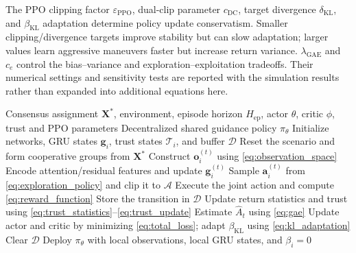The PPO clipping factor $\varepsilon_{\mathrm{PPO}}$, dual-clip parameter $c_{\mathrm{DC}}$,
target divergence $\delta_{\mathrm{KL}}$, and $\beta_{\mathrm{KL}}$ adaptation determine policy
update conservatism. Smaller clipping/divergence targets improve stability but can slow
adaptation; larger values learn aggressive maneuvers faster but increase return variance.
$\lambda_{\mathrm{GAE}}$ and $c_e$ control the bias--variance and exploration--exploitation
tradeoffs. Their numerical settings and sensitivity tests are reported with the simulation
results rather than expanded into additional equations here.

\begin{algorithm}[!t]
\caption{ART-MAPPO Cooperative Interception Guidance}
\label{alg:artmappo}
\footnotesize
\begin{algorithmic}[1]
\REQUIRE Consensus assignment $\mathbf X^{*}$, environment, episode horizon
$H_{\mathrm{ep}}$, actor $\theta$, critic $\phi$, trust and PPO parameters
\ENSURE Decentralized shared guidance policy $\pi_{\theta}$
\STATE Initialize networks, GRU states $\mathbf g_i$, trust states $\mathcal T_i$, and buffer
$\mathcal D$
    \STATE Reset the scenario and form cooperative groups from $\mathbf X^{*}$
            \STATE Construct $\mathbf o_i^{(t)}$ using \eqref{eq:observation_space}
            \STATE Encode attention/residual features and update $\mathbf g_i^{(t)}$
            \STATE Sample $\mathbf a_i^{(t)}$ from \eqref{eq:exploration_policy} and clip it
            to $\mathcal A$
        \ENDFOR
        \STATE Execute the joint action and compute \eqref{eq:reward_function}
        \STATE Store the transition in $\mathcal D$
    \ENDFOR
    \STATE Update return statistics and trust using
    \eqref{eq:trust_statistics}--\eqref{eq:trust_update}
    \STATE Estimate $\widehat A_t$ using \eqref{eq:gae}
    \STATE Update actor and critic by minimizing \eqref{eq:total_loss}; adapt
    $\beta_{\mathrm{KL}}$ using \eqref{eq:kl_adaptation}
    \STATE Clear $\mathcal D$
\ENDFOR
\STATE Deploy $\pi_{\theta}$ with local observations, local GRU states, and $\beta_i=0$
\end{algorithmic}
\end{algorithm}
